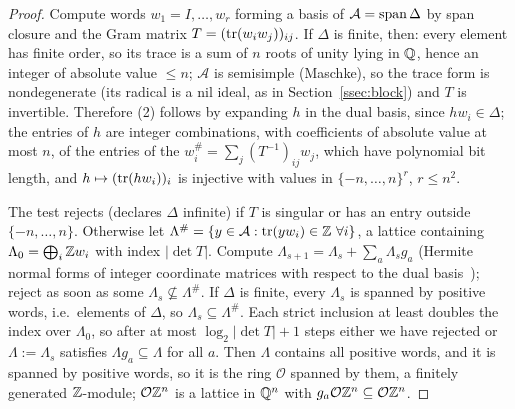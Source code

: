\begin{proof}
Compute words $w_1=I,\ldots,w_r$ forming a basis of $\mathcal A=\operatorname{span}\Delta$ by span closure and
the Gram matrix $T=(\operatorname{tr}(w_iw_j))_{ij}$. If $\Delta$ is finite, then: every element has finite order,
so its trace is a sum of $n$ roots of unity lying in $\mathbb{Q}$, hence an integer of absolute value
$\le n$; $\mathcal A$ is semisimple (Maschke), so the trace form is nondegenerate (its radical is a nil
ideal, as in Section~\ref{ssec:block}) and $T$ is invertible. Therefore (2) follows by expanding $h$
in the dual basis, since $hw_i\in\Delta$; the entries of $h$ are integer combinations, with
coefficients of absolute value at most $n$, of the entries of the $w_i^\#=\sum_j(T^{-1})_{ij}w_j$,
which have polynomial bit length, and $h\mapsto(\operatorname{tr}(hw_i))_i$ is injective with values in
$\{-n,\ldots,n\}^r$, $r\le n^2$.

The test rejects (declares $\Delta$ infinite) if $T$ is singular or has an entry outside
$\{-n,\ldots,n\}$. Otherwise let $\Lambda^\#=\{y\in\mathcal A:\operatorname{tr}(yw_i)\in\mathbb{Z}\ \forall i\}$, a lattice
containing $\Lambda_0=\bigoplus_i\mathbb{Z} w_i$ with index $|\det T|$. Compute
$\Lambda_{s+1}=\Lambda_s+\sum_a\Lambda_sg_a$ (Hermite normal forms of integer coordinate matrices
with respect to the dual basis~\cite{KB79}); reject as soon as some $\Lambda_s\not\subseteq\Lambda^\#$.
If $\Delta$ is finite, every $\Lambda_s$ is spanned by positive words, i.e.\ elements of $\Delta$, so
$\Lambda_s\subseteq\Lambda^\#$. Each strict inclusion at least doubles the index over $\Lambda_0$, so
after at most $\log_2|\det T|+1$ steps either we have rejected or $\Lambda:=\Lambda_s$ satisfies
$\Lambda g_a\subseteq\Lambda$ for all $a$. Then $\Lambda$ contains all positive words, and it is spanned
by positive words, so it is the ring $\mathcal O$ spanned by them, a finitely generated $\mathbb{Z}$-module;
$\mathcal O\mathbb{Z}^n$ is a lattice in $\mathbb{Q}^n$ with $g_a\mathcal O\mathbb{Z}^n\subseteq\mathcal O\mathbb{Z}^n$.


\end{proof}
